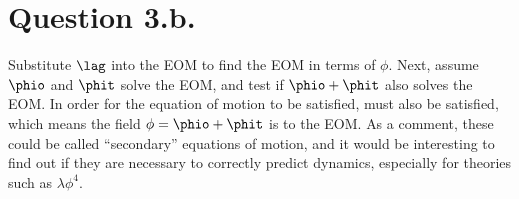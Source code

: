 \documentclass{article}
\begin{document}
\section{Question 3.b.}
Substitute $\lag$ into the EOM to find the EOM in terms of $\phi$.
Next, assume $\phio$ and $\phit$ solve the EOM, and test if $\phio+\phit$ also solves the EOM.
\e{\phi=\phio+\phit}
In order for the equation of motion  to be satisfied,  must also be satisfied, which means the field $\phi=\phio+\phit$ is  to the EOM. As a comment, these could be called ``secondary'' equations of motion, and it would be interesting to find out if they are necessary to correctly predict dynamics, especially for theories such as $\lambda \phi^4$.
\end{document}
